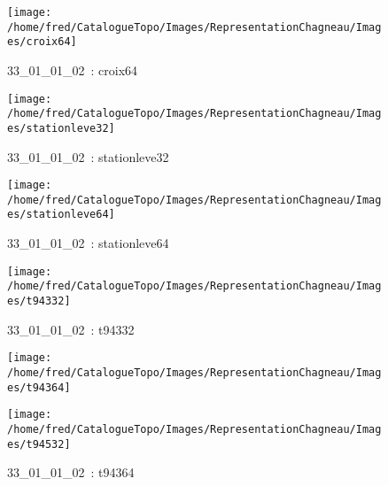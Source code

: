 \documentclass[12pt,titlepage]{book}
\begin{document}
\begin{figure}[h!]
\begin{minipage}[t]{3cm}
    \begin{center}
      \texttt{[image: /home/fred/CatalogueTopo/Images/RepresentationChagneau/Images/croix64]}
      \caption[~33\_01\_01\_02]{\small{33\_01\_01\_02~:} \tiny{croix64}}\label{croix64}
    \end{center}
  \end{minipage}
  \begin{minipage}[t]{3cm}
    \begin{center}
      \texttt{[image: /home/fred/CatalogueTopo/Images/RepresentationChagneau/Images/stationleve32]}
      \caption[~33\_01\_01\_02]{\small{33\_01\_01\_02~:} \tiny{stationleve32}}\label{stationleve32}
    \end{center}
  \end{minipage}
  \begin{minipage}[t]{3cm}
    \begin{center}
      \texttt{[image: /home/fred/CatalogueTopo/Images/RepresentationChagneau/Images/stationleve64]}
      \caption[~33\_01\_01\_02]{\small{33\_01\_01\_02~:} \tiny{stationleve64}}\label{stationleve64}
    \end{center}
  \end{minipage}
  \begin{minipage}[t]{3cm}
    \begin{center}
      \texttt{[image: /home/fred/CatalogueTopo/Images/RepresentationChagneau/Images/t94332]}
      \caption[~33\_01\_01\_02]{\small{33\_01\_01\_02~:} \tiny{t94332}}\label{t94332}
    \end{center}
  \end{minipage}
  \begin{minipage}[t]{3cm}
    \begin{center}
      \texttt{[image: /home/fred/CatalogueTopo/Images/RepresentationChagneau/Images/t94364]}
      \caption[~33\_01\_01\_02]{\small{33\_01\_01\_02~:} \tiny{t94364}}\label{t94364}
    \end{center}
  \end{minipage}
  \begin{minipage}[t]{3cm}
    \begin{center}
      \texttt{[image: /home/fred/CatalogueTopo/Images/RepresentationChagneau/Images/t94532]}

\end{center}
\end{minipage}
\end{figure}
\end{document}
